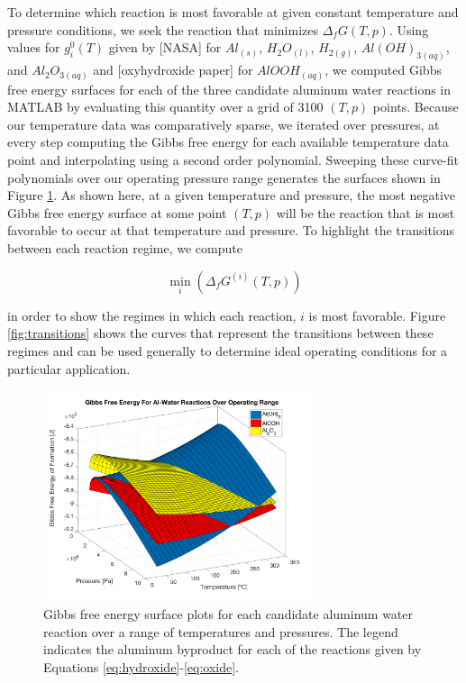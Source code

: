\documentclass[preprint,12pt,3p]{elsarticle}
\begin{document}
To determine which reaction is most favorable at given constant temperature and
pressure conditions, we seek the reaction that minimizes $\Delta_f G(T,p)$.
Using values for $g_i^0(T)$ given by [NASA] for $Al_{(s)}$, $H_2O_{(l)}$,
$H_{2(g)}$, $Al(OH)_{3(aq)}$, and $Al_2O_{3(aq)}$ and [oxyhydroxide paper] for
$AlOOH_{(aq)}$, we computed Gibbs free energy surfaces for each of the three
candidate aluminum water reactions in MATLAB by evaluating this quantity over a
grid of 3100 $(T,p)$ points. Because our temperature data was comparatively
sparse, we iterated over pressures, at every step computing the Gibbs free
energy for each available temperature data point and interpolating using a
second order polynomial. Sweeping these curve-fit polynomials over our operating
pressure range generates the surfaces shown in Figure \ref{fig:gibbs_surface}.
As shown here, at a given temperature and pressure, the most negative Gibbs free
energy surface at some point $(T,p)$ will be the reaction that is most favorable
to occur at that temperature and pressure. To highlight the transitions between
each reaction regime, we compute

\begin{equation}
  \min_i(\Delta_fG^{(i)}(T,p))
  \label{eq:min_gibbs}
\end{equation}

\noindent in order to show the regimes in which each reaction, $i$ is most
favorable.  Figure \ref{fig:transitions} shows the curves that represent the
transitions between these regimes and can be used generally to determine ideal
operating conditions for a particular application.

\begin{figure}
  \centering
  \includegraphics[width=0.7\textwidth]{fig/gibbs_total_surface}
  \caption{Gibbs free energy surface plots for each candidate aluminum water
  reaction over a range of temperatures and pressures. The legend indicates the
  aluminum byproduct for each of the reactions given by Equations
\ref{eq:hydroxide}-\ref{eq:oxide}.}
  \label{fig:gibbs_surface}
\end{figure}
\end{document}
